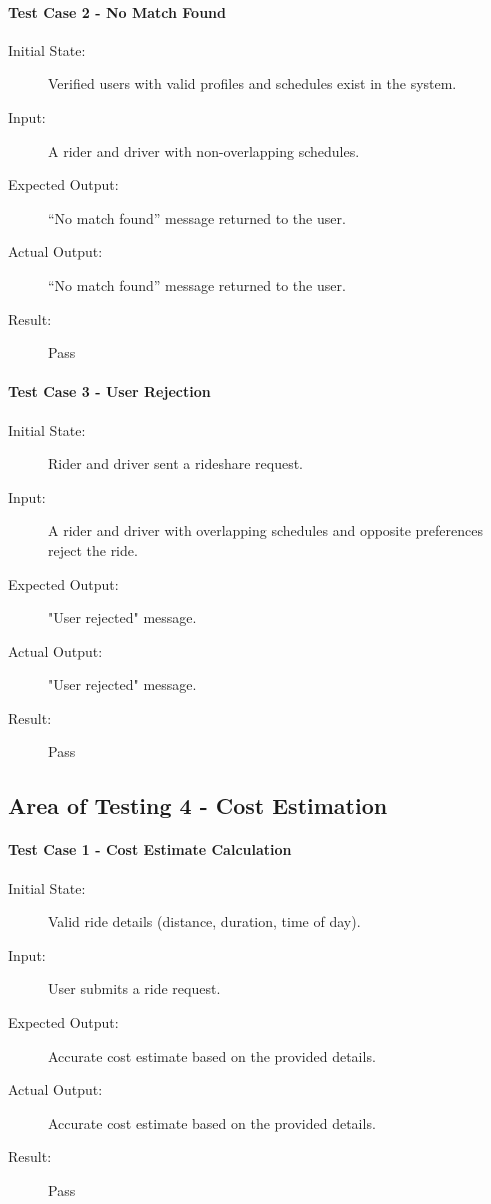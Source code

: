 \paragraph{Test Case 2 - No Match Found} \label{test-FR3-2}
\begin{description}
    \item[Initial State:] Verified users with valid profiles and schedules exist in the system.
    \item[Input:] A rider and driver with non-overlapping schedules.
    \item[Expected Output:] ``No match found'' message returned to the user.
    \item[Actual Output:]``No match found'' message returned to the user.
    \item[Result:] Pass
\end{description}
\paragraph{Test Case 3 - User Rejection} \label{test-FR3-3}
\begin{description}
    \item[Initial State:] Rider and driver sent a rideshare request.
    \item[Input:] A rider and driver with overlapping schedules and opposite preferences reject the ride.
    \item[Expected Output:] "User rejected" message.
    \item[Actual Output:] "User rejected" message.
    \item[Result:] Pass
\end{description}

\subsection{Area of Testing 4 - Cost Estimation}
\paragraph{Test Case 1 - Cost Estimate Calculation} \label{test-FR4-1}
\begin{description}
    \item[Initial State:] Valid ride details (distance, duration, time of day).
    \item[Input:] User submits a ride request.
    \item[Expected Output:] Accurate cost estimate based on the provided details.
    \item[Actual Output:] Accurate cost estimate based on the provided details. 
    \item[Result:] Pass
\end{description}
